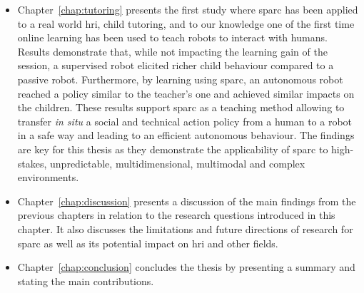 \begin{itemize}
	\item Chapter~\ref{chap:tutoring} presents the first study where \gls{sparc} has been applied to a real world \gls{hri}, child tutoring, and to our knowledge one of the first time online learning has been used to teach robots to interact with humans. Results demonstrate that, while not impacting the learning gain of the session, a supervised robot elicited richer child behaviour compared to a passive robot. Furthermore, by learning using \gls{sparc}, an autonomous robot reached a policy similar to the teacher's one and achieved similar impacts on the children. These results support \gls{sparc} as a teaching method allowing to transfer \textit{in situ} a social and technical action policy from a human to a robot in a safe way and leading to an efficient autonomous behaviour. The findings are key for this thesis as they demonstrate the applicability of \gls{sparc} to high-stakes, unpredictable, multidimensional, multimodal and complex environments.
	
	\item Chapter~\ref{chap:discussion} presents a discussion of the main findings from the previous chapters in relation to the research questions introduced in this chapter. It also discusses the limitations and future directions of research for \gls{sparc} as well as its potential impact on \gls{hri} and other fields.

	\item Chapter~\ref{chap:conclusion} concludes the thesis by presenting a summary and stating the main contributions.
	
\end{itemize}
